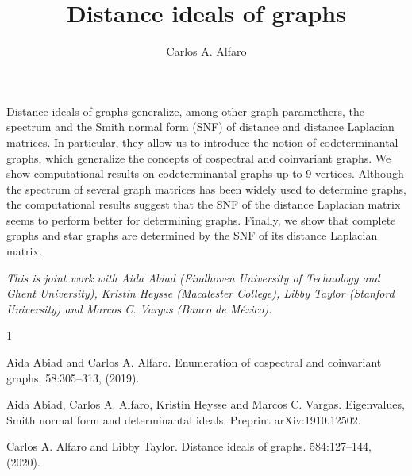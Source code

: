 \documentclass[a4paper]{amsart}
\date{}
\begin{document}
\title{Distance ideals of graphs}
\author{Carlos A. Alfaro} %
\address{Banco de M\'exico} %

\maketitle


Distance ideals of graphs generalize, among other graph paramethers, the spectrum and the Smith normal form (SNF) of distance and distance Laplacian matrices.
In particular, they allow us to introduce the notion of codeterminantal graphs, which generalize the concepts of cospectral and coinvariant graphs. We show computational results on codeterminantal graphs up to 9 vertices.
Although the spectrum of several graph matrices has been widely used to determine graphs, the computational results suggest that the SNF of the distance Laplacian matrix seems to perform better for determining graphs. 
Finally, we show that complete graphs and star graphs are determined by the SNF of its distance Laplacian matrix.


\emph{This is joint work with Aida Abiad (Eindhoven University of Technology and Ghent University), Kristin Heysse (Macalester College), Libby Taylor (Stanford University) and Marcos C. Vargas (Banco de M\'exico).
}

\begin{thebibliography}{1}

Aida Abiad and Carlos A. Alfaro.
\newblock Enumeration of cospectral and coinvariant graphs.
 58:305--313, (2019).

Aida Abiad, Carlos A. Alfaro, Kristin Heysse and Marcos C. Vargas.
\newblock Eigenvalues, Smith normal form and determinantal ideals.
\newblock Preprint arXiv:1910.12502.

Carlos A. Alfaro and Libby Taylor.
\newblock Distance ideals of graphs.
  584:127--144, (2020).

\end{thebibliography}
\end{document}
